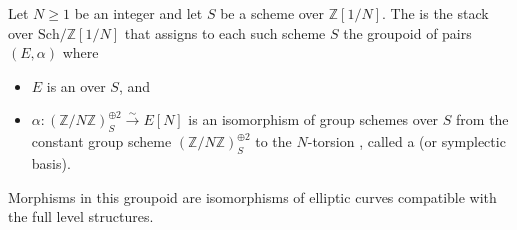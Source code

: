 \begin{definition} \label{definition:moduli_stack_of_elliptic_curves_with_full_level_N_structure}
Let $N \geq 1$ be an integer and let $S$ be a scheme over $\mathbb{Z}[1/N]$. The  is the stack over $\mathrm{Sch}/\mathbb{Z}[1/N]$ that assigns to each such scheme $S$ the groupoid of pairs $(E, \alpha)$ where
\begin{itemize}
    \item $E$ is an  over $S$, and
    \item $\alpha: (\mathbb{Z}/N\mathbb{Z})_S^{\oplus 2} \xrightarrow{\sim} E[N]$ is an isomorphism of group schemes over $S$ from the constant group scheme $(\mathbb{Z}/N\mathbb{Z})_S^{\oplus 2}$ to the $N$-torsion , called a  (or symplectic basis).
\end{itemize}
Morphisms in this groupoid are isomorphisms of elliptic curves compatible with the full level structures.
\end{definition}
